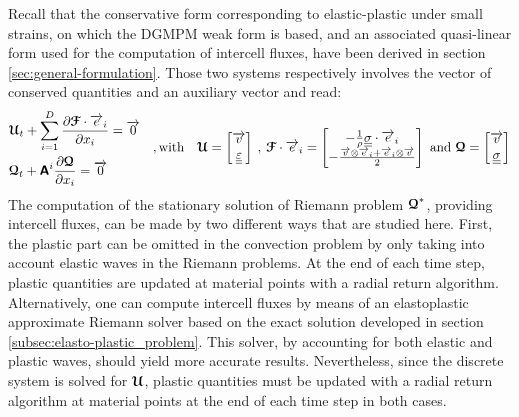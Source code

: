 Recall that the conservative form corresponding to elastic-plastic under small strains, on which the DGMPM weak form is based, and an associated quasi-linear form used for the computation of intercell fluxes, have been derived in section \ref{sec:general-formulation}. Those two systems respectively involves the vector of conserved quantities and an auxiliary vector and read:
\begin{equation*}
  \begin{aligned}
  & {\boldsymbol{\mathcal{U}}}_t + \sum_{i=1}^D \frac{\partial {\boldsymbol{\mathcal{F}}}\cdot {\overrightarrow{e}}_i}{\partial x_i} = {\overrightarrow{0}} \\
  & {\boldsymbol{\mathcal{Q}}}_t + \boldsymbol{\mathsf{A}}^i \frac{\partial {\boldsymbol{\mathcal{Q}}}}{\partial x_i} = {\overrightarrow{0}}
  \end{aligned} \quad,\text{with}\quad {\boldsymbol{\mathcal{U}}} =\left[\begin{matrix}{\overrightarrow{v}} \\ {\underline{\underline{\varepsilon}}}\end{matrix}\right] \:,\: {\boldsymbol{\mathcal{F}}}\cdot{\overrightarrow{e}}_i = \left[\begin{matrix}-\frac{1}{\rho}{\underline{\underline{\sigma}}}\cdot{\overrightarrow{e}}_i\\-\frac{{\overrightarrow{v}}\otimes{\overrightarrow{e}}_i +{\overrightarrow{e}}_i \otimes{\overrightarrow{v}} }{2} \end{matrix}\right] \text{ and } {\boldsymbol{\mathcal{Q}}}=\left[\begin{matrix}{\overrightarrow{v}}\\ {\underline{\underline{\sigma}}}\end{matrix}\right]
\end{equation*}
The computation of the stationary solution of Riemann problem ${\boldsymbol{\mathcal{Q}}}^*$, providing intercell fluxes, can be made by two different ways that are studied here.
First, the plastic part can be omitted in the convection problem by only taking into account elastic waves in the Riemann problems. At the end of each time step, plastic quantities are updated at material points with a radial return algorithm. %
Alternatively, one can compute intercell fluxes by means of an elastoplastic approximate Riemann solver based on the exact solution developed in section \ref{subsec:elasto-plastic_problem}. This solver, by accounting for both elastic and plastic waves, should yield more accurate results.
Nevertheless, since the discrete system is solved for ${\boldsymbol{\mathcal{U}}}$, plastic quantities must be updated with a radial return algorithm at material points at the end of each time step in both cases.

